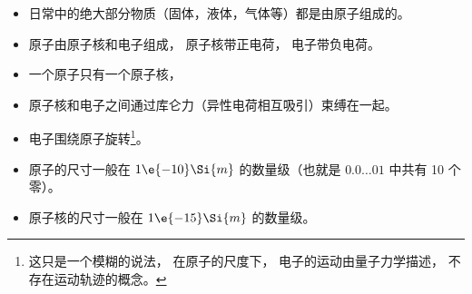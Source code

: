 
\begin{issues}
\issueDraft
\end{issues}

\begin{itemize}
\item 日常中的绝大部分物质（固体，液体，气体等）都是由原子组成的。
\item 原子由原子核和电子组成， 原子核带正电荷， 电子带负电荷。
\item 一个原子只有一个原子核， 
\item 原子核和电子之间通过库仑力（异性电荷相互吸引）束缚在一起。
\item 电子围绕原子旋转\footnote{这只是一个模糊的说法， 在原子的尺度下， 电子的运动由量子力学描述， 不存在运动轨迹的概念。}。
\item 原子的尺寸一般在 $1\e{-10}\Si{m}$ 的数量级（也就是 $0.0\dots01$ 中共有 10 个零）。
\item 原子核的尺寸一般在 $1\e{-15}\Si{m}$ 的数量级。
\end{itemize}
